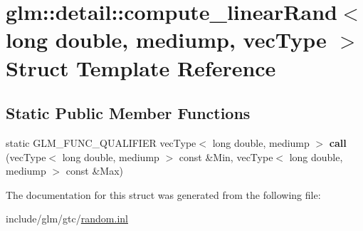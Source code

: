 \hypertarget{structglm_1_1detail_1_1compute__linearRand_3_01long_01double_00_01mediump_00_01vecType_01_4}{}\section{glm\+:\+:detail\+:\+:compute\+\_\+linear\+Rand$<$ long double, mediump, vec\+Type $>$ Struct Template Reference}
\label{structglm_1_1detail_1_1compute__linearRand_3_01long_01double_00_01mediump_00_01vecType_01_4}
\subsection*{Static Public Member Functions}
\begin{DoxyCompactItemize}
\item 
\mbox{\label{structglm_1_1detail_1_1compute__linearRand_3_01long_01double_00_01mediump_00_01vecType_01_4_a80a124d814f09a6892657886e0ae345a}} 
static G\+L\+M\+\_\+\+F\+U\+N\+C\+\_\+\+Q\+U\+A\+L\+I\+F\+I\+ER vec\+Type$<$ long double, mediump $>$ {\bfseries call} (vec\+Type$<$ long double, mediump $>$ const \&Min, vec\+Type$<$ long double, mediump $>$ const \&Max)
\end{DoxyCompactItemize}


The documentation for this struct was generated from the following file\+:\begin{DoxyCompactItemize}
\item 
include/glm/gtc/\hyperlink{random_8inl}{random.\+inl}\end{DoxyCompactItemize}
